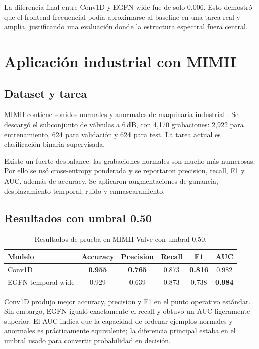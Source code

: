 \documentclass[11pt,a4paper]{article}
\begin{document}
La diferencia final entre Conv1D y EGFN wide fue de solo \(0.006\). Esto
demostró que el frontend frecuencial podía aproximarse al baseline en una tarea
real y amplia, justificando una evaluación donde la estructura espectral fuera
central.

\section{Aplicación industrial con MIMII}

\subsection{Dataset y tarea}

MIMII contiene sonidos normales y anormales de maquinaria industrial
\cite{purohit2019mimii}. Se descargó el subconjunto de válvulas a \(6\,\mathrm{dB}\),
con 4,170 grabaciones: 2,922 para entrenamiento, 624 para validación y 624
para test. La tarea actual es clasificación binaria supervisada.

Existe un fuerte desbalance: las grabaciones normales son mucho más numerosas.
Por ello se usó cross-entropy ponderada y se reportaron precision, recall, F1 y
AUC, además de accuracy. Se aplicaron augmentaciones de ganancia, desplazamiento
temporal, ruido y enmascaramiento.

\subsection{Resultados con umbral 0.50}

\begin{table}[ht]
\centering
\caption{Resultados de prueba en MIMII Valve con umbral 0.50.}
\label{tab:mimii-default}
\begin{tabular}{lccccc}
\toprule
Modelo & Accuracy & Precision & Recall & F1 & AUC \\
\midrule
Conv1D & \textbf{0.955} & \textbf{0.765} & 0.873 & \textbf{0.816} & 0.982 \\
EGFN temporal wide & 0.929 & 0.639 & 0.873 & 0.738 & \textbf{0.984} \\
\bottomrule
\end{tabular}
\end{table}

Conv1D produjo mejor accuracy, precision y F1 en el punto operativo estándar.
Sin embargo, EGFN igualó exactamente el recall y obtuvo un AUC ligeramente
superior. El AUC indica que la capacidad de ordenar ejemplos normales y
anormales es prácticamente equivalente; la diferencia principal estaba en el
umbral usado para convertir probabilidad en decisión.
\end{document}

